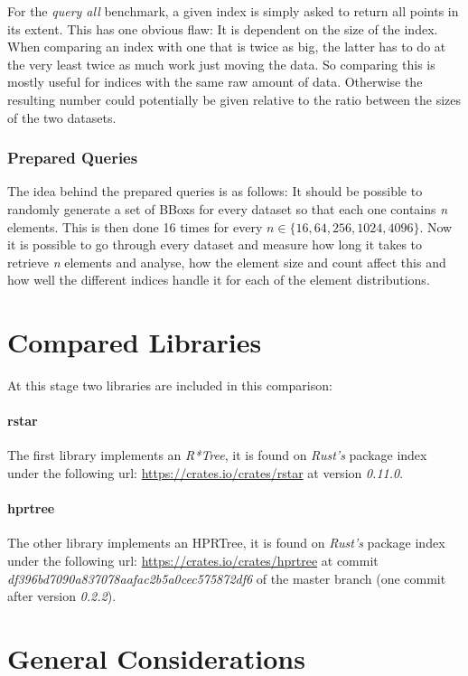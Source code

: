 For the \textit{query all} benchmark, a given index is simply asked to return all points in its extent. This has one obvious flaw: It is dependent on the size of the index. When comparing an index with one that is twice as big, the latter has to do at the very least twice as much work just moving the data. So comparing this is mostly useful for indices with the same raw amount of data. Otherwise the resulting number could potentially be given relative to the ratio between the sizes of the two datasets.

\subsubsection{Prepared Queries}

The idea behind the prepared queries is as follows: It should be possible to randomly generate a set of \acsp{BBox} for every dataset so that each one contains \textit{n} elements. This is then done 16 times for every \(n \in \{16, 64, 256, 1024, 4096\}\). Now it is possible to go through every dataset and measure how long it takes to retrieve \textit{n} elements and analyse, how the element size and count affect this and how well the different indices handle it for each of the element distributions.

\section{Compared Libraries}

At this stage two libraries are included in this comparison:

\paragraph{rstar} The first library implements an \textit{R*Tree}, it is found on \textit{Rust's} package index under the following url: \url{https://crates.io/crates/rstar} at version \textit{0.11.0}.

\paragraph{hprtree} The other library implements an \acs{HPRTree}, it is found on \textit{Rust's} package index under the following url: \url{https://crates.io/crates/hprtree} at commit \textit{df396bd7090a8370\-78aafac2b5a0cec575872df6} of the master branch (one commit after version \textit{0.2.2}).


\section{General Considerations}
\label{sec:considerations}

